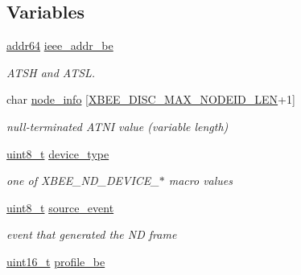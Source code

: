 \subsection*{Variables}
\begin{DoxyCompactItemize}
\item 
\hypertarget{group__xbee__discovery_ga719f89263ecae9f127dc655c1c14fdac}{\hyperlink{unionaddr64}{addr64} \hyperlink{group__xbee__discovery_ga719f89263ecae9f127dc655c1c14fdac}{ieee\-\_\-addr\-\_\-be}}\label{group__xbee__discovery_ga719f89263ecae9f127dc655c1c14fdac}

\begin{DoxyCompactList}\small\item\em A\-T\-S\-H and A\-T\-S\-L. \end{DoxyCompactList}\item 
\hypertarget{group__xbee__discovery_gaa667bab3abb953bc14d9f5bcc36644b8}{char \hyperlink{group__xbee__discovery_gaa667bab3abb953bc14d9f5bcc36644b8}{node\-\_\-info} \mbox{[}\hyperlink{group__xbee__discovery_ga0df6e63d6ccca22fcf154b6f0be46da6}{X\-B\-E\-E\-\_\-\-D\-I\-S\-C\-\_\-\-M\-A\-X\-\_\-\-N\-O\-D\-E\-I\-D\-\_\-\-L\-E\-N}+1\mbox{]}}\label{group__xbee__discovery_gaa667bab3abb953bc14d9f5bcc36644b8}

\begin{DoxyCompactList}\small\item\em null-\/terminated A\-T\-N\-I value (variable length) \end{DoxyCompactList}\item 
\hypertarget{group__xbee__discovery_gab9c960832b7e834e6657e0c6ab4c3d8a}{\hyperlink{group__hal_gae1affc9ca37cfb624959c866a73f83c2}{uint8\-\_\-t} \hyperlink{group__xbee__discovery_gab9c960832b7e834e6657e0c6ab4c3d8a}{device\-\_\-type}}\label{group__xbee__discovery_gab9c960832b7e834e6657e0c6ab4c3d8a}

\begin{DoxyCompactList}\small\item\em one of X\-B\-E\-E\-\_\-\-N\-D\-\_\-\-D\-E\-V\-I\-C\-E\-\_\-$\ast$ macro values \end{DoxyCompactList}\item 
\hypertarget{group__xbee__discovery_ga0fb7817a87e8f275a4313c6629d189c7}{\hyperlink{group__hal_gae1affc9ca37cfb624959c866a73f83c2}{uint8\-\_\-t} \hyperlink{group__xbee__discovery_ga0fb7817a87e8f275a4313c6629d189c7}{source\-\_\-event}}\label{group__xbee__discovery_ga0fb7817a87e8f275a4313c6629d189c7}

\begin{DoxyCompactList}\small\item\em event that generated the N\-D frame \end{DoxyCompactList}\item 
\hypertarget{group__xbee__discovery_ga4de8649ccb3a83bd14fc5702328bb667}{\hyperlink{group__hal_ga5a8b2dc9e45a9ee81a94ef304fb62505}{uint16\-\_\-t} \hyperlink{group__xbee__discovery_ga4de8649ccb3a83bd14fc5702328bb667}{profile\-\_\-be}}\label{group__xbee__discovery_ga4de8649ccb3a83bd14fc5702328bb667}


\end{DoxyCompactItemize}
